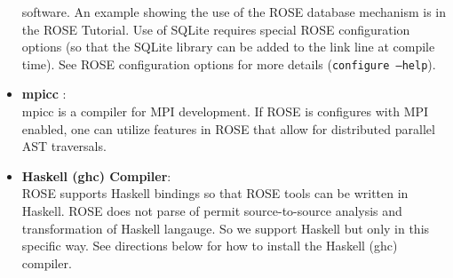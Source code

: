 \begin{itemize}
          software. %
          An example showing the use of the ROSE database mechanism is in the ROSE
          Tutorial. Use of SQLite requires special ROSE configuration options (so that
          the SQLite library can be added to the link line at compile time).  See ROSE
          configuration options for more details ({\tt configure --help}).
   \item {\bf mpicc} : \\
          mpicc is a compiler for MPI development. If ROSE is configures with MPI
          enabled, one can utilize features in ROSE that allow for distributed
          parallel AST traversals.
   \item {\bf Haskell (ghc) Compiler}: \\
          ROSE supports Haskell bindings so that ROSE tools can be written in Haskell.
          ROSE does not parse of permit source-to-source analysis and transformation of
          Haskell langauge.  So we support Haskell but only in this specific way.
          See directions below for how to install the Haskell (ghc) compiler.

\end{itemize}



